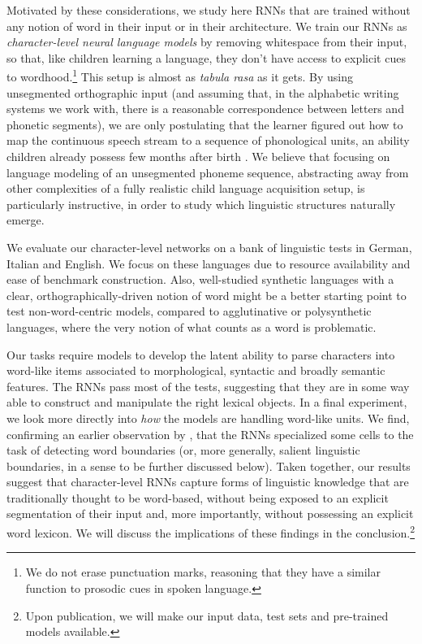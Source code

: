Motivated by these considerations, we study here RNNs that are trained
without any notion of word in their input or in their
architecture. We train our RNNs as \emph{character-level neural
  language models}
\cite[CNLMs,][]{Mikolov:etal:2011,Sutskever:etal:2011,DBLP:journals/corr/Graves13}
by removing whitespace from their input, so that, like children
learning a language, they don't have access to explicit cues to
wordhood.\footnote{We do not erase punctuation marks, reasoning that
  they have a similar function to prosodic cues in spoken language.}
This setup is almost as \emph{tabula rasa} as it gets. By using
unsegmented orthographic input (and assuming that, in the alphabetic
writing systems we work with, there is a reasonable correspondence
between letters and phonetic segments), we are only postulating that
the learner figured out how to map the continuous speech stream to a
sequence of phonological units, an ability children already possess
few months after birth \cite[e.g.,][]{Maye:etal:2002,Kuhl:2004}. We believe that focusing on language modeling of an unsegmented phoneme sequence, abstracting away from other complexities of a fully realistic child language acquisition setup, is particularly instructive, in order to study which linguistic structures naturally emerge.

We evaluate our character-level networks on a bank of linguistic tests
in German, Italian and English. We focus on these languages due to
resource availability and ease of benchmark construction. Also, well-studied synthetic languages with a clear,
orthographically-driven notion of word might be a better starting point to
test non-word-centric models, compared to agglutinative or
polysynthetic languages, where the very notion of what counts as a
word is problematic. %
  
Our tasks require models to develop the latent
ability to parse characters into word-like items associated to
morphological, syntactic and broadly semantic features. The RNNs
pass most of the tests, suggesting that they are in some way able to
construct and manipulate the right lexical objects. In a final experiment,
we look more directly into \emph{how} the models are handling
word-like units. We find, confirming an earlier observation by
, that the RNNs specialized some
cells to the task of detecting word boundaries (or, more generally,
salient linguistic boundaries, in a sense to be further discussed
below). Taken together, our results suggest that character-level RNNs
capture forms of linguistic knowledge that are traditionally thought to be
word-based, without being exposed to an explicit segmentation of their
 input and, more importantly, without possessing an explicit word
lexicon. We will discuss the implications of these findings in the
conclusion.\footnote{Upon publication, we will make our input data,
  test sets and pre-trained models available.}

